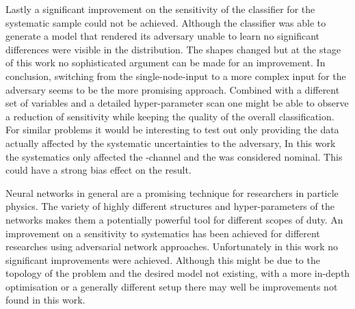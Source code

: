 Lastly a significant improvement on the sensitivity of the classifier for the systematic sample could not be achieved. Although the classifier was able to generate a model that rendered its adversary unable to learn no significant differences were visible in the distribution. The shapes changed but at the stage of this work no sophisticated argument can be made for an improvement. In conclusion, switching from the single-node-input to a more complex input for the adversary seems to be the more promising approach. Combined with a different set of variables and a detailed hyper-parameter scan one might be able to observe a reduction of sensitivity while keeping the quality of the overall classification.
For similar problems it would be interesting to test out only providing the data actually affected by the systematic uncertainties to the adversary, In this work the systematics only affected the \tW-channel and the \ttbar was considered nominal. This could have a strong bias effect on the result.

Neural networks in general are a promising technique for researchers in particle physics. The variety of highly different structures and hyper-parameters of the networks makes them a potentially powerful tool for different scopes of duty. An improvement on a sensitivity to systematics has been achieved for different researches using adversarial network approaches. Unfortunately in this work no significant improvements were achieved. Although this might be due to the topology of the problem and the desired model not existing, with a more in-depth optimisation or a generally different setup there may well be improvements not found in this work.

